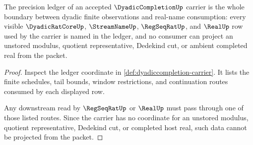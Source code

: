 \begin{theorem}
\label{thm:dyadiccompletion-ledger-boundary}
The precision ledger of an accepted $\DyadicCompletionUp$ carrier is the whole
boundary between dyadic finite observations and real-name consumption: every
visible $\DyadicRatCoreUp$, $\StreamNameUp$, $\RegSeqRatUp$, and $\RealUp$ row
used by the carrier is named in the ledger, and no consumer can project an
unstored modulus, quotient representative, Dedekind cut, or ambient completed
real from the packet.
\end{theorem}
\begin{proof}
Inspect the ledger coordinate in \autoref{def:dyadiccompletion-carrier}. It
lists the finite schedules, tail bounds, window restrictions, and continuation
routes consumed by each displayed row.

Any downstream read by $\RegSeqRatUp$ or $\RealUp$ must pass through one of
those listed routes. Since the carrier has no coordinate for an unstored
modulus, quotient representative, Dedekind cut, or completed host real, such
data cannot be projected from the packet.
\end{proof}

